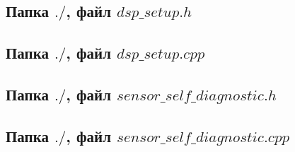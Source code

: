 \documentclass[codelisting]{../espd}
\begin{document}
{\subsection{Папка $./$, файл $dsp\_setup.h$}

\subsection{Папка $./$, файл $dsp\_setup.cpp$}

\subsection{Папка $./$, файл $sensor\_self\_diagnostic.h$}

\subsection{Папка $./$, файл $sensor\_self\_diagnostic.cpp$}



% 

% 

% 

% 
%
\cleardoublepage
{}

%
% 
%
% 
% 
%
\registrationlistESPD
}
\end{document}
